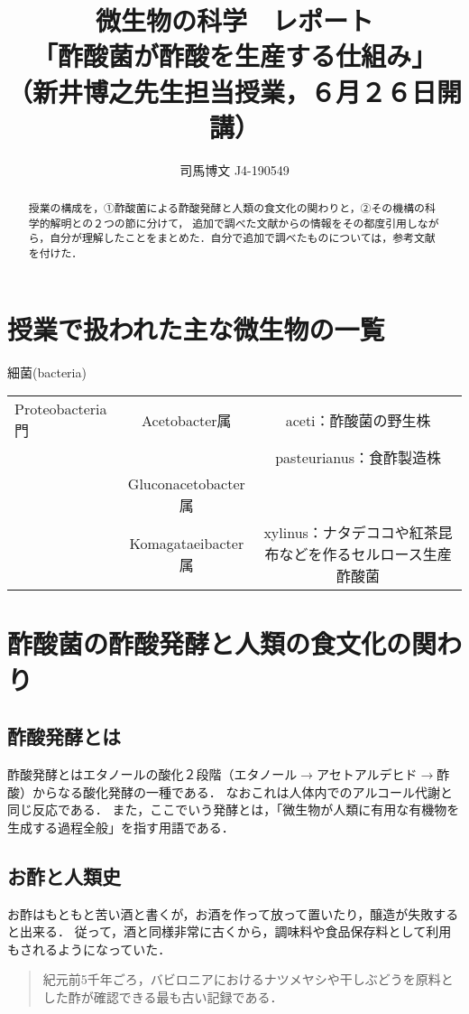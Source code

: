 \documentclass[uplatex, dvipdfmx]{jsarticle}
\title{微生物の科学　レポート\\「酢酸菌が酢酸を生産する仕組み」\\（新井博之先生担当授業，６月２６日開講）}
\author{司馬博文 J4-190549}
\begin{document}
\maketitle
\begin{abstract}
    授業の構成を，①酢酸菌による酢酸発酵と人類の食文化の関わりと，②その機構の科学的解明との２つの節に分けて，
    追加で調べた文献からの情報をその都度引用しながら，自分が理解したことをまとめた．自分で追加で調べたものについては，参考文献を付けた．
\end{abstract}

\section*{授業で扱われた主な微生物の一覧}

細菌(bacteria)
\begin{center}
\begin{table}[h]\centering
    \begin{tabular}{|l|c|c|}\hline
        Proteobacteria門&Acetobacter属&aceti：酢酸菌の野生株\\
        &&pasteurianus：食酢製造株\\\hline
        &Gluconacetobacter属&\\\hline
        &Komagataeibacter属&xylinus：ナタデココや紅茶昆布などを作るセルロース生産酢酸菌\\\hline
    \end{tabular}
\end{table}
\end{center}

\section{酢酸菌の酢酸発酵と人類の食文化の関わり}

\subsection{酢酸発酵とは}

酢酸発酵とはエタノールの酸化２段階（エタノール$\to$アセトアルデヒド$\to$酢酸）からなる酸化発酵の一種である．
なおこれは人体内でのアルコール代謝と同じ反応である．
また，ここでいう発酵とは，「微生物が人類に有用な有機物を生成する過程全般」を指す用語である．

\subsection{お酢と人類史}
お酢はもともと苦い酒と書くが，お酒を作って放って置いたり，醸造が失敗すると出来る．
従って，酒と同様非常に古くから，調味料や食品保存料として利用もされるようになっていた．
\begin{quote}
    紀元前5千年ごろ，バビロニアにおけるナツメヤシや干しぶどうを原料とした酢が確認できる最も古い記録である．\cite{バイオよもやま話}
\end{quote}
\end{document}
